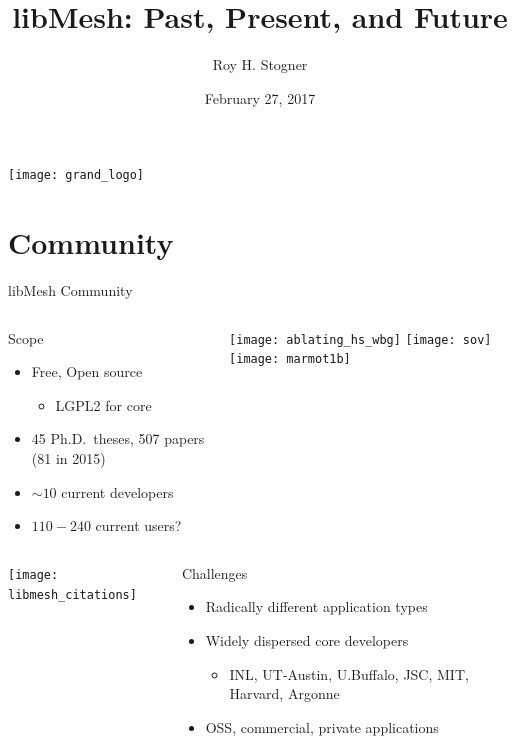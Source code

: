 \documentclass[mathserif]{beamer}
\date{February 27, 2017}
\author[R. Stogner]{Roy H. Stogner}
\institute{The University of Texas at Austin}
\title[libMesh]{libMesh: Past, Present, and Future}
\begin{document}
\begin{frame}
\begin{center}
\texttt{[image: grand\_logo]}\\
\end{center}
\titlepage
\begin{flushright}
\end{flushright}
\end{frame}


\section{Community}


\begin{frame}{libMesh Community}
\begin{columns}
\begin{block}{Scope}
\begin{itemize}
\item Free, Open source
\begin{itemize}
\item LGPL2 for core
\end{itemize}
\item 45 Ph.D.\ theses, 507 papers (81 in 2015)
\item $\sim10$ current developers
\item $110-240$ current users?
\end{itemize}
\end{block}

\texttt{[image: ablating\_hs\_wbg]}
\texttt{[image: sov]}
\texttt{[image: marmot1b]}
\end{columns}

\begin{columns}
\texttt{[image: libmesh\_citations]}

\begin{block}{Challenges}
\begin{itemize}
\item Radically different application types
\item Widely dispersed core developers
\begin{itemize}
\item INL, UT-Austin, U.Buffalo, JSC, MIT, Harvard, Argonne
\end{itemize}
\item OSS, commercial, private applications
\end{itemize}
\end{block}
\end{columns}

\end{frame}
\end{document}
